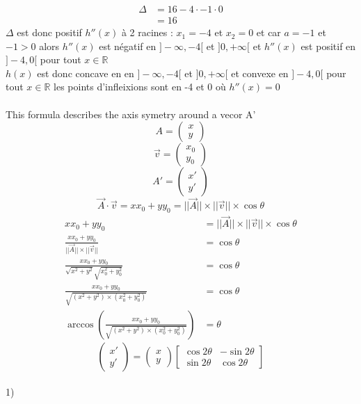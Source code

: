 \documentclass[french]{article}
\begin{document}
\begin{align*}
\Delta&=16-4\cdot-1\cdot0 \\
&=16
\end{align*}
$\Delta$ est donc positif $h''(x)$ à 2 racines : $x_1=-4$ et $x_2=0$ et car $a=-1$ et $-1>0$ alors $h''(x)$ est négatif en $]-\infty,-4[$ et $]0,+\infty[$ et $h''(x)$ est positif en $]-4,0[$ pour tout $x\in\mathbb{R}$ \\
$h(x)$ est donc concave en en $]-\infty,-4[$ et $]0,+\infty[$ et convexe en $]-4,0[$ pour tout $x\in\mathbb{R}$ les points d'infleixions sont en -4 et 0 où $h''(x)=0$ \\
\\
This formula describes the axis symetry around a vecor A' \\
\[
A=
\begin{pmatrix}
x \\
y
\end{pmatrix}
\]
\[
\vec{v}=
\begin{pmatrix}
x_0 \\
y_0
\end{pmatrix}
\]
\[
A'=
\begin{pmatrix}
x' \\
y'
\end{pmatrix}
\]
\[\vec{A}\cdot\vec{v}=xx_0+yy_0=||\vec{A}||\times||\vec{v}||\times\cos\theta\]
\begin{align*}
xx_0+yy_0&=||\vec{A}||\times||\vec{v}||\times\cos\theta \\
\frac{xx_0+yy_0}{||\vec{A}||\times||\vec{v}||}&=\cos\theta \\
\frac{xx_0+yy_0}{\sqrt{x^2+y^2}\sqrt{x_0^2+y_0^2}}&=\cos\theta \\
\frac{xx_0+yy_0}{\sqrt{(x^2+y^2)\times (x_0^2+y_0^2)}}&=\cos\theta \\
\arccos\left(\frac{xx_0+yy_0}{\sqrt{(x^2+y^2)\times (x_0^2+y_0^2)}}\right)&=\theta
\end{align*}
\[
\begin{pmatrix}
x' \\
y'
\end{pmatrix}
=
\begin{pmatrix}
x \\
y
\end{pmatrix}
\begin{bmatrix}
\cos2\theta & -\sin2\theta\\
\sin2\theta & \cos2\theta
\end{bmatrix}\]
\\
1) \\
\end{document}
